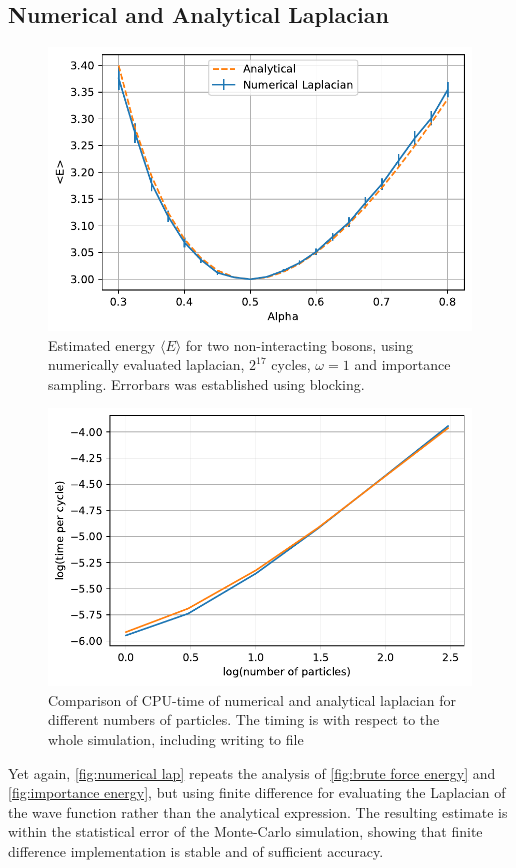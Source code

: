 \subsection{Numerical and Analytical Laplacian}
\begin{figure}
	\includegraphics[width=.8\linewidth]{figures/numericalLap.pdf}
	\centering
	\caption{Estimated energy $\langle E \rangle$ for two non-interacting bosons, using numerically evaluated laplacian, $2^{17}$ cycles, $\omega = 1$ and importance sampling. Errorbars was established using blocking. }
	\label{fig:numerical lap}
\end{figure}

\begin{figure}
	\includegraphics[width=.8\linewidth]{figures/numericalTime.pdf}
	\centering
	\caption{Comparison of CPU-time of numerical and analytical laplacian for different numbers of particles. The timing is with respect to the whole simulation, including writing to file}
	\label{fig:numerical time}
\end{figure}

Yet again, \autoref{fig:numerical lap} repeats the analysis of \autoref{fig:brute force energy} and 
\autoref{fig:importance energy}, but using finite difference for evaluating the Laplacian of the wave function rather than the analytical expression. The resulting estimate is within the statistical error of the Monte-Carlo simulation, showing that finite difference implementation is stable and of sufficient accuracy. 

